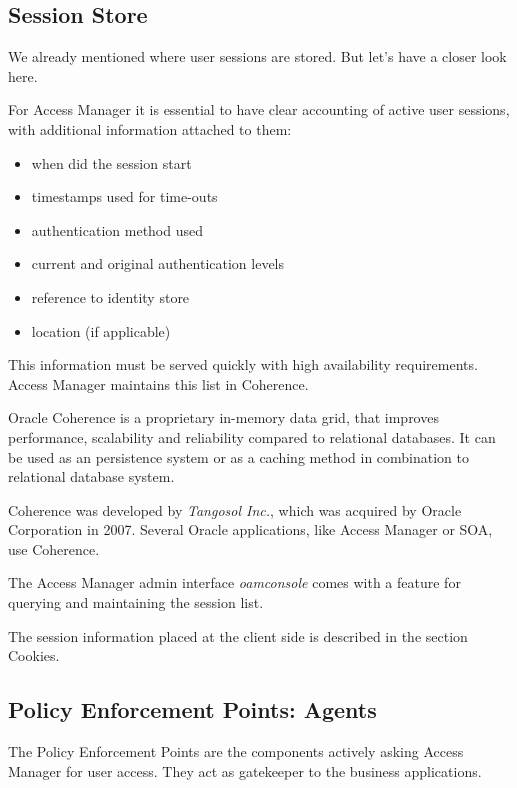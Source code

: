 \subsection{Session Store}

We already mentioned where user sessions are stored. But let's have a
closer look here.

For Access Manager it is essential to have clear accounting of active
user sessions, with additional information attached to them:

\begin{itemize}
    \item when did the session start
    \item timestamps used for time-outs
    \item authentication method used
    \item current and original authentication levels
    \item reference to identity store
    \item location (if applicable)
\end{itemize}

This information must be served quickly with high availability
requirements. Access Manager maintains this list in Coherence.

\begin{framed}
    Oracle Coherence is a proprietary in-memory data grid, that improves
    performance, scalability and reliability compared to relational
    databases. It can be used as an persistence system or as a caching
    method in combination to relational database system.
    
    Coherence was developed by \emph{Tangosol Inc.}, which was acquired 
    by Oracle Corporation in 2007. Several Oracle applications, like 
    Access Manager or SOA, use Coherence.
\end{framed}

The Access Manager admin interface \emph{oamconsole} comes with a
feature for querying and maintaining the session list.

The session information placed at the client side is described in the
section Cookies.


\subsection{Policy Enforcement Points: Agents}

The Policy Enforcement Points are the components actively asking Access
Manager for user access. They act as gatekeeper to the business
applications.




